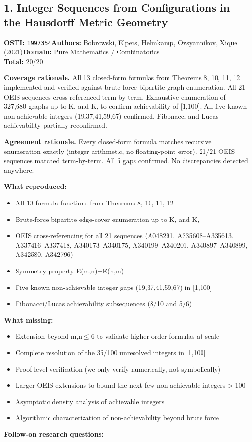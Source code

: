 \subsection{1. Integer Sequences from Configurations in the Hausdorff Metric Geometry}
\textbf{OSTI:} \texttt{1997354}\quad\textbf{Authors:} Bobrowski, Elpers, Helmkamp, Ovsyannikov, Xique (2021)\quad\textbf{Domain:} Pure Mathematics / Combinatorics\\
\quad{}\quad\textbf{Total:} 20/20\par\smallskip
\noindent\textbf{Coverage rationale.} All 13 closed-form formulas from Theorems 8, 10, 11, 12 implemented and verified against brute-force bipartite-graph enumeration. All 21 OEIS sequences cross-referenced term-by-term. Exhaustive enumeration of 327,680 graphs up to K, and K, to confirm achievability of [1,100]. All five known non-achievable integers (19,37,41,59,67) confirmed. Fibonacci and Lucas achievability partially reconfirmed.\par
\noindent\textbf{Agreement rationale.} Every closed-form formula matches recursive enumeration exactly (integer arithmetic, no floating-point error). 21/21 OEIS sequences matched term-by-term. All 5 gaps confirmed. No discrepancies detected anywhere.\par\smallskip
\noindent\textbf{What reproduced:}
\begin{itemize}[leftmargin=1.4em,itemsep=0.2em,topsep=0.2em]
\item All 13 formula functions from Theorems 8, 10, 11, 12
\item Brute-force bipartite edge-cover enumeration up to K, and K,
\item OEIS cross-referencing for all 21 sequences (A048291, A335608--A335613, A337416--A337418, A340173--A340175, A340199--A340201, A340897--A340899, A342580, A342796)
\item Symmetry property E(m,n)=E(n,m)
\item Five known non-achievable integer gaps (19,37,41,59,67) in [1,100]
\item Fibonacci/Lucas achievability subsequences (8/10 and 5/6)
\end{itemize}\noindent\textbf{What missing:}
\begin{itemize}[leftmargin=1.4em,itemsep=0.2em,topsep=0.2em]
\item Extension beyond m,n$\leq$6 to validate higher-order formulas at scale
\item Complete resolution of the 35/100 unresolved integers in [1,100]
\item Proof-level verification (we only verify numerically, not symbolically)
\item Larger OEIS extensions to bound the next few non-achievable integers \textgreater{} 100
\item Asymptotic density analysis of achievable integers
\item Algorithmic characterization of non-achievability beyond brute force
\end{itemize}\noindent\textbf{Follow-on research questions:}

